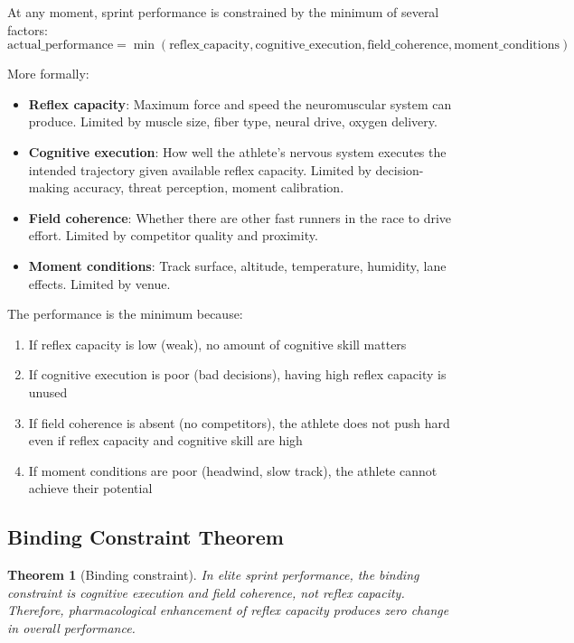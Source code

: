 \documentclass[11pt,twocolumn]{article}
\newtheorem{theorem}{Theorem}
\theoremstyle{definition}
\theoremstyle{remark}
\begin{document}
At any moment, sprint performance is constrained by the minimum of several factors:
\begin{equation}
\text{actual\_performance} = \min(\text{reflex\_capacity}, \text{cognitive\_execution}, \text{field\_coherence}, \text{moment\_conditions})
\end{equation}

More formally:
\begin{itemize}[leftmargin=1.2em]
\item \textbf{Reflex capacity}: Maximum force and speed the neuromuscular system can produce. Limited by muscle size, fiber type, neural drive, oxygen delivery.
\item \textbf{Cognitive execution}: How well the athlete's nervous system executes the intended trajectory given available reflex capacity. Limited by decision-making accuracy, threat perception, moment calibration.
\item \textbf{Field coherence}: Whether there are other fast runners in the race to drive effort. Limited by competitor quality and proximity.
\item \textbf{Moment conditions}: Track surface, altitude, temperature, humidity, lane effects. Limited by venue.
\end{itemize}

The performance is the minimum because:
\begin{enumerate}[leftmargin=1.2em]
\item If reflex capacity is low (weak), no amount of cognitive skill matters
\item If cognitive execution is poor (bad decisions), having high reflex capacity is unused
\item If field coherence is absent (no competitors), the athlete does not push hard even if reflex capacity and cognitive skill are high
\item If moment conditions are poor (headwind, slow track), the athlete cannot achieve their potential
\end{enumerate}

\subsection{Binding Constraint Theorem}

\begin{theorem}[Binding constraint]
\label{thm:binding}
In elite sprint performance, the binding constraint is cognitive execution and field coherence, not reflex capacity. Therefore, pharmacological enhancement of reflex capacity produces zero change in overall performance.
\end{theorem}
\end{document}
